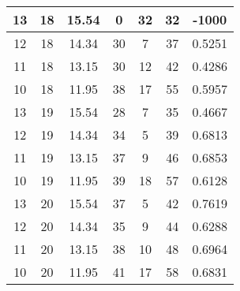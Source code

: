 \documentclass[letterpaper, 12pt]{article}
\begin{document}
\begin{longtable}{|c|c|c|c|c|c|c|}
\hline
13 & 18 & 15.54 & 0 & 32 & 32 & -1000 \\
\hline
12 & 18 & 14.34 & 30 & 7 & 37 & 0.5251 \\
\hline
11 & 18 & 13.15 & 30 & 12 & 42 & 0.4286 \\
\hline
10 & 18 & 11.95 & 38 & 17 & 55 & 0.5957 \\
\hline
13 & 19 & 15.54 & 28 & 7 & 35 & 0.4667 \\
\hline
12 & 19 & 14.34 & 34 & 5 & 39 & 0.6813 \\
\hline
11 & 19 & 13.15 & 37 & 9 & 46 & 0.6853 \\
\hline
10 & 19 & 11.95 & 39 & 18 & 57 & 0.6128 \\
\hline
13 & 20 & 15.54 & 37 & 5 & 42 & 0.7619 \\
\hline
12 & 20 & 14.34 & 35 & 9 & 44 & 0.6288 \\
\hline
11 & 20 & 13.15 & 38 & 10 & 48 & 0.6964 \\
\hline
10 & 20 & 11.95 & 41 & 17 & 58 & 0.6831 \\
\hline
\end{longtable}
\end{document}
